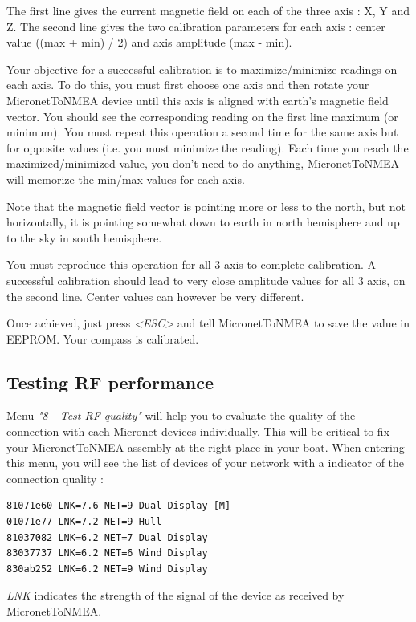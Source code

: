 \documentclass{report}
\begin{document}
The first line gives the current magnetic field on each of the three axis : X, Y and Z.
The second line gives the two calibration parameters for each axis : center value ((max + min) / 2) and axis amplitude (max - min).

Your objective for a successful calibration is to maximize/minimize readings on each axis. To do this, you must first choose one axis and then rotate your MicronetToNMEA device until this axis is aligned with earth's magnetic field vector. You should see the corresponding reading on the first line maximum (or minimum).
You must repeat this operation a second time for the same axis but for opposite values (i.e. you must minimize the reading). Each time you reach the maximized/minimized value, you don't need to do anything, MicronetToNMEA will memorize the min/max values for each axis.

Note that the magnetic field vector is pointing more or less to the north, but not horizontally, it is pointing somewhat down to earth in north hemisphere and up to the sky in south hemisphere.

You must reproduce this operation for all 3 axis to complete calibration.
A successful calibration should lead to very close amplitude values for all 3 axis, on the second line. Center values can however be very different.

Once achieved, just press \emph{<ESC>} and tell MicronetToNMEA to save the value in EEPROM. Your compass is calibrated.

\subsection{Testing RF performance}

Menu \emph{"8 - Test RF quality"} will help you to evaluate the quality of the connection with each Micronet devices individually. This will be critical to fix your MicronetToNMEA assembly at the right place in your boat. When entering this menu, you will see the list of devices of your network with a indicator of the connection quality :

\begin{verbatim}
81071e60 LNK=7.6 NET=9 Dual Display [M]
01071e77 LNK=7.2 NET=9 Hull
81037082 LNK=6.2 NET=7 Dual Display
83037737 LNK=6.2 NET=6 Wind Display
830ab252 LNK=6.2 NET=9 Wind Display
\end{verbatim}

\emph{LNK} indicates the strength of the signal of the device as received by MicronetToNMEA.
\end{document}
